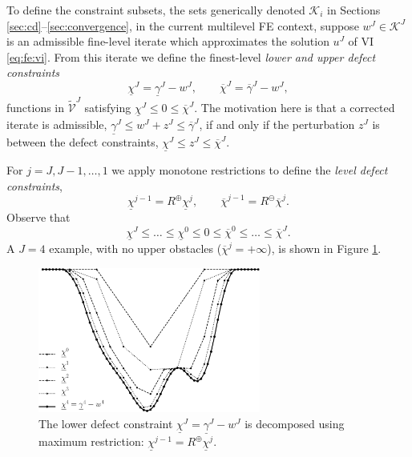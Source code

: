 \documentclass[letterpaper,final,12pt,reqno]{amsart}
\theoremstyle{cstyle}
\theoremstyle{cstyle*}
\theoremstyle{dstyle}
\numberwithin{equation}{section}
\numberwithin{figure}{section}
\numberwithin{table}{section}
\numberwithin{theorem}{section}
\newcommand{\cK}{\mathcal{K}}
\newcommand{\maxR}{R^{\bm{\oplus}}}
\newcommand{\minR}{R^{\bm{\ominus}}}
\begin{document}
To define the constraint subsets, the sets generically denoted $\cK_i$ in Sections \ref{sec:cd}--\ref{sec:convergence}, in the current multilevel FE context, suppose $w^J \in \cK^J$ is an admissible fine-level iterate which approximates the solution $u^J$ of VI \eqref{eq:fe:vi}.  From this iterate we define the finest-level \emph{lower and upper defect constraints} \cite{GraeserKornhuber2009}
\begin{equation}
\underline{\chi}^J = \underline{\gamma}^J - w^J, \qquad \overline{\chi}^J = \overline{\gamma}^J - w^J, \label{eq:fe:defectconstraints}
\end{equation}
functions in $\tilde{\mathcal{V}}^J$ satisfying $\underline{\chi}^J \le 0 \le \overline{\chi}^J$.  The motivation here is that a corrected iterate is admissible, $\underline{\gamma}^J \le w^J + z^J \le \overline{\gamma}^J$, if and only if the perturbation $z^J$ is between the defect constraints, $\underline{\chi}^J \le z^J \le \overline{\chi}^J$.

For $j=J,J-1,\dots,1$ we apply monotone restrictions to define the \emph{level defect constraints},
\begin{equation}
\underline{\chi}^{j-1} = \maxR \underline{\chi}^j, \qquad \overline{\chi}^{j-1} = \minR \overline{\chi}^j. \label{eq:fe:chilevels}
\end{equation}
Observe that
\begin{equation}
\underline{\chi}^{J} \le \dots \le \underline{\chi}^0 \le 0 \le \overline{\chi}^0 \le \dots \le \overline{\chi}^J. \label{eq:fe:chiordering}
\end{equation}
A $J=4$ example, with no upper obstacles ($\overline{\chi}^j=+\infty$), is shown in Figure \ref{fig:chiphilevels}.

\begin{figure}
\includegraphics[width=0.65\textwidth]{fixfigs/chiphilevels.pdf}
\caption{The lower defect constraint $\underline{\chi}^J = \underline{\gamma}^J - w^J$ is decomposed using maximum restriction: $\underline{\chi}^{j-1} = \maxR \underline{\chi}^j$.}
\label{fig:chiphilevels}
\end{figure}
\end{document}
